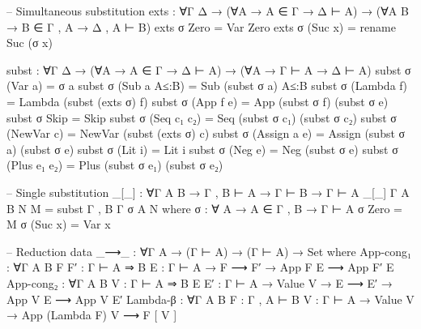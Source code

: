 \documentclass{article}
\begin{document}
\begin{prev}
\begin{code}
-- Simultaneous substitution
exts : ∀{Γ Δ} → (∀{A} → A ∈ Γ → Δ ⊢ A) 
              → (∀{A B} → B ∈ Γ , A → Δ , A ⊢ B)
exts σ Zero = Var Zero
exts σ (Suc x) = rename Suc (σ x)

subst : ∀{Γ Δ} → (∀{A} → A ∈ Γ → Δ ⊢ A)
               → (∀{A} → Γ ⊢ A → Δ ⊢ A)
subst σ (Var a) = σ a
subst σ (Sub a A≤:B) = Sub (subst σ a) A≤:B
subst σ (Lambda f) = Lambda (subst (exts σ) f)
subst σ (App f e) = App (subst σ f) (subst σ e)
subst σ Skip = Skip
subst σ (Seq c₁ c₂) = Seq (subst σ c₁) (subst σ c₂)
subst σ (NewVar c) = NewVar (subst (exts σ) c)
subst σ (Assign a e) = Assign (subst σ a) (subst σ e)
subst σ (Lit i) = Lit i
subst σ (Neg e) = Neg (subst σ e)
subst σ (Plus e₁ e₂) = Plus (subst σ e₁) (subst σ e₂)

-- Single substitution
_[_] : ∀{Γ A B} → Γ , B ⊢ A → Γ ⊢ B → Γ ⊢ A
_[_] {Γ} {A} {B} N M = subst {Γ , B} {Γ} σ {A} N
    where
    σ : ∀ {A} → A ∈ Γ , B → Γ ⊢ A
    σ Zero = M
    σ (Suc x) = Var x

-- Reduction
data _⟶_ : ∀{Γ A} → (Γ ⊢ A) → (Γ ⊢ A) → Set where
    App-cong₁ : ∀{Γ A B} {F F′ : Γ ⊢ A ⇒ B} {E : Γ ⊢ A} 
                    → F ⟶ F′ → App F E ⟶ App F′ E
    App-cong₂ : ∀{Γ A B} {V : Γ ⊢ A ⇒ B} {E E′ : Γ ⊢ A} 
                    → Value V → E ⟶ E′ → App V E ⟶ App V E′
    Lambda-β : ∀{Γ A B} {F : Γ , A ⊢ B} {V : Γ ⊢ A}
                    → Value V → App (Lambda F) V ⟶ F [ V ]
\end{code}
\end{prev}
\end{document}
